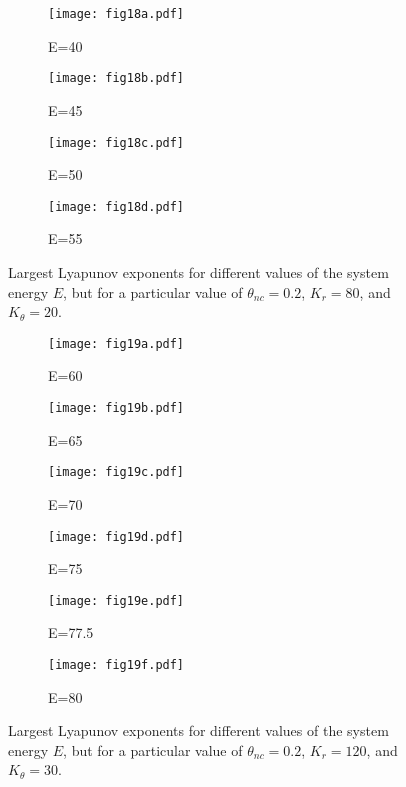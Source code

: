 \documentclass[aps,prd,showpacs,nofootinbib,floats,floatfix,preprintnumbers,groupedaddress,twocolumn]{revtex4-1}
\begin{document}
\begin{figure}[H]
	\centering
	\begin{subfigure}[b]{0.49\linewidth}
		\texttt{[image: fig18a.pdf]}
		\caption{E=40}
	\end{subfigure}
	\begin{subfigure}[b]{0.49\linewidth}
		\texttt{[image: fig18b.pdf]}
		\caption{E=45}
	\end{subfigure}
	\begin{subfigure}[b]{0.49\linewidth}
		\texttt{[image: fig18c.pdf]}
		\caption{E=50}
	\end{subfigure}
	\begin{subfigure}[b]{0.49\linewidth}
		\texttt{[image: fig18d.pdf]}
		\caption{E=55}
	\end{subfigure}
	\caption{Largest Lyapunov exponents for different values of the system energy $E$, but for a particular value of $\theta_{nc}=0.2$, $K_{r}=80$, and $K_{\theta}=20$.}
	\label{fig:18}
\end{figure}

\begin{figure}[hbt]
	\centering
	\begin{subfigure}[b]{0.49\linewidth}
		\texttt{[image: fig19a.pdf]}
		\caption{E=60}
	\end{subfigure}
	\begin{subfigure}[b]{0.49\linewidth}
		\texttt{[image: fig19b.pdf]}
		\caption{E=65}
	\end{subfigure}
	\begin{subfigure}[b]{0.49\linewidth}
		\texttt{[image: fig19c.pdf]}
		\caption{E=70}
	\end{subfigure}
	\begin{subfigure}[b]{0.49\linewidth}
		\texttt{[image: fig19d.pdf]}
		\caption{E=75}
	\end{subfigure}
	\begin{subfigure}[b]{0.49\linewidth}
		\texttt{[image: fig19e.pdf]}
		\caption{E=77.5}
	\end{subfigure}
	\begin{subfigure}[b]{0.49\linewidth}
		\texttt{[image: fig19f.pdf]}
		\caption{E=80}
	\end{subfigure}
\caption{Largest Lyapunov exponents for different values of the system energy $E$, but for a particular value of $\theta_{nc}=0.2$, $K_{r}=120$, and $K_{\theta}=30$.}
\label{fig:19}
\end{figure}
\end{document}
